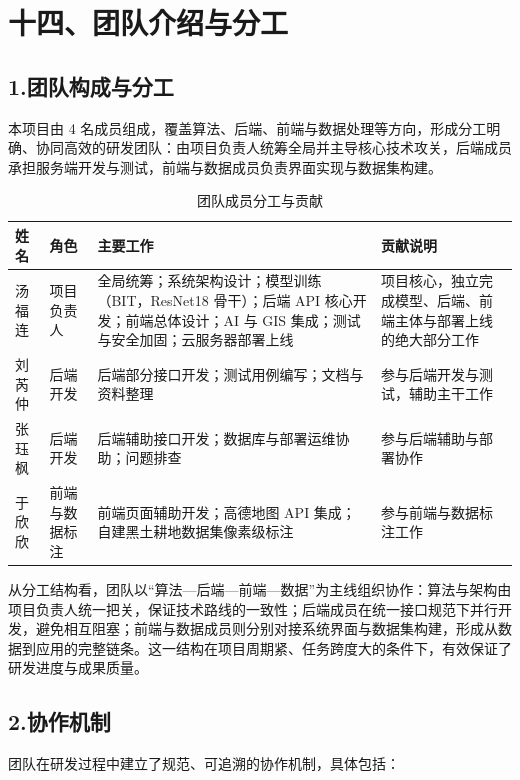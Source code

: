\section{十四、团队介绍与分工}

\subsection{1.团队构成与分工}

本项目由 4 名成员组成，覆盖算法、后端、前端与数据处理等方向，形成分工明确、协同高效的研发团队：由项目负责人统筹全局并主导核心技术攻关，后端成员承担服务端开发与测试，前端与数据成员负责界面实现与数据集构建。

\begin{table}[htbp]
\centering
\caption{团队成员分工与贡献}
\begin{tabular}{|p{1.9cm}|p{2.6cm}|p{6.6cm}|p{3.0cm}|}
\hline
\textbf{姓名} & \textbf{角色} & \textbf{主要工作} & \textbf{贡献说明} \\
\hline
汤福连 & 项目负责人 & 全局统筹；系统架构设计；模型训练（BIT，ResNet18 骨干）；后端 API 核心开发；前端总体设计；AI 与 GIS 集成；测试与安全加固；云服务器部署上线 & 项目核心，独立完成模型、后端、前端主体与部署上线的绝大部分工作 \\
\hline
刘芮仲 & 后端开发 & 后端部分接口开发；测试用例编写；文档与资料整理 & 参与后端开发与测试，辅助主干工作 \\
\hline
张珏枫 & 后端开发 & 后端辅助接口开发；数据库与部署运维协助；问题排查 & 参与后端辅助与部署协作 \\
\hline
于欣欣 & 前端与数据标注 & 前端页面辅助开发；高德地图 API 集成；自建黑土耕地数据集像素级标注 & 参与前端与数据标注工作 \\
\hline
\end{tabular}
\end{table}

从分工结构看，团队以“算法—后端—前端—数据”为主线组织协作：算法与架构由项目负责人统一把关，保证技术路线的一致性；后端成员在统一接口规范下并行开发，避免相互阻塞；前端与数据成员则分别对接系统界面与数据集构建，形成从数据到应用的完整链条。这一结构在项目周期紧、任务跨度大的条件下，有效保证了研发进度与成果质量。

\subsection{2.协作机制}

团队在研发过程中建立了规范、可追溯的协作机制，具体包括：

